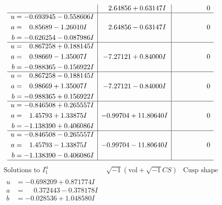 \documentclass[1p]{elsarticle_modified}
\theoremstyle{definition}
\newcommand{\I}{\sqrt{-1}}
\begin{document}
$$\begin{array}{c|c|c}
 & \phantom{-}2.64856 + 0.63147 I & \phantom{-0.000000 } 0 \\ \hline\begin{aligned}
u &= -0.693945 - 0.558606 I \\
a &= \phantom{-}0.85689 - 1.26010 I \\
b &= -0.626254 - 0.087986 I\end{aligned}
 & \phantom{-}2.64856 - 0.63147 I & \phantom{-0.000000 } 0 \\ \hline\begin{aligned}
u &= \phantom{-}0.867258 + 0.188145 I \\
a &= \phantom{-}0.98669 - 1.35007 I \\
b &= -0.988365 - 0.156922 I\end{aligned}
 & -7.27121 + 0.84000 I & \phantom{-0.000000 } 0 \\ \hline\begin{aligned}
u &= \phantom{-}0.867258 - 0.188145 I \\
a &= \phantom{-}0.98669 + 1.35007 I \\
b &= -0.988365 + 0.156922 I\end{aligned}
 & -7.27121 - 0.84000 I & \phantom{-0.000000 } 0 \\ \hline\begin{aligned}
u &= -0.846508 + 0.265557 I \\
a &= \phantom{-}1.45793 + 1.33875 I \\
b &= -1.138390 + 0.406086 I\end{aligned}
 & -0.99704 + 11.80640 I & \phantom{-0.000000 } 0 \\ \hline\begin{aligned}
u &= -0.846508 - 0.265557 I \\
a &= \phantom{-}1.45793 - 1.33875 I \\
b &= -1.138390 - 0.406086 I\end{aligned}
 & -0.99704 - 11.80640 I & \phantom{-0.000000 } 0\\
 \hline 
 \end{array}$$\newpage$$\begin{array}{c|c|c}  
\text{Solutions to }I^u_{1}& \I (\text{vol} + \sqrt{-1}CS) & \text{Cusp shape}\\
 \hline 
\begin{aligned}
u &= -0.698209 + 0.871774 I \\
a &= \phantom{-}0.372443 - 0.378178 I \\
b &= -0.028536 + 1.048580 I\end{aligned}

\end{array}$$
\end{document}
